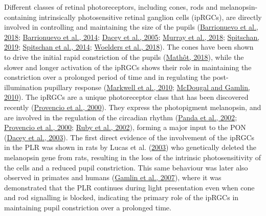 \documentclass[
]{article}
\begin{document}
Different classes of retinal photoreceptors, including cones, rods and melanopsin-containing intrinsically photosensitive retinal ganglion cells (ipRGCs), are directly involved in controlling and maintaining the size of the pupils (\protect\hyperlink{ref-Barrionuevo2018}{Barrionuevo et al., 2018}; \protect\hyperlink{ref-Barrionuevo2014}{Barrionuevo et al., 2014}; \protect\hyperlink{ref-Dacey2005}{Dacey et al., 2005}; \protect\hyperlink{ref-Murray2018}{Murray et al., 2018}; \protect\hyperlink{ref-Spitschan2019}{Spitschan, 2019}; \protect\hyperlink{ref-Spitschan2014}{Spitschan et al., 2014}; \protect\hyperlink{ref-Woelders2018}{Woelders et al., 2018}). The cones have been shown to drive the initial rapid constriction of the pupils (\protect\hyperlink{ref-Mathot2018}{Mathôt, 2018}), while the slower and longer activation of the ipRGCs shows their role in maintaining the constriction over a prolonged period of time and in regulating the post-illumination pupillary response (\protect\hyperlink{ref-Markwell2010}{Markwell et al., 2010}; \protect\hyperlink{ref-McDougal2010}{McDougal and Gamlin, 2010}). The ipRGCs are a unique photoreceptor class that has been discovered recently (\protect\hyperlink{ref-Provencio2000}{Provencio et al., 2000}). They express the photopigment melanopsin, and are involved in the regulation of the circadian rhythm (\protect\hyperlink{ref-Panda2002}{Panda et al., 2002}; \protect\hyperlink{ref-Provencio2000}{Provencio et al., 2000}; \protect\hyperlink{ref-Ruby2002}{Ruby et al., 2002}), forming a major input to the PON (\protect\hyperlink{ref-Dacey2003}{Dacey et al., 2003}). The first direct evidence of the involvement of the ipRGCs in the PLR was shown in rats by Lucas et al. (\protect\hyperlink{ref-Lucas2003}{2003}) who genetically deleted the melanopsin gene from rats, resulting in the loss of the intrinsic photosensitivity of the cells and a reduced pupil constriction. This same behaviour was later also observed in primates and humans (\protect\hyperlink{ref-Gamlin2007}{Gamlin et al., 2007}), where it was demonstrated that the PLR continues during light presentation even when cone and rod signalling is blocked, indicating the primary role of the ipRGCs in maintaining pupil constriction over a prolonged time.
\end{document}
